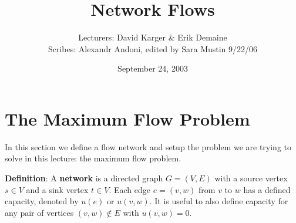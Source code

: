 \documentclass{article}
\title{Network Flows}
\date{September 24, 2003}
\author{Lecturers: David Karger & Erik Demaine\\ Scribes: Alexandr Andoni, edited by Sara Mustin 9/22/06}
\begin{document}

%
%
%
%

%



\section{The Maximum Flow Problem}

In this section we define a flow network and setup the problem we are
trying to solve in this lecture: the maximum flow problem.


\textbf{Definition}:
A \textbf{network} is a directed graph $G=(V,E)$ with a source
vertex $s \in V$ and a sink vertex $t \in V$.  Each edge $e =
(v, w)$ from $v$ to $w$ has a defined capacity, denoted by
$u(e)$ or $u(v, w)$.  It is useful to also define capacity for
any pair of vertices $(v, w) \not \in E$ with $u(v, w) = 0$.
\end{document}
